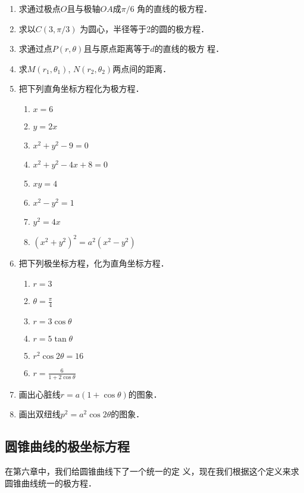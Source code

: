 \begin{ex}
\begin{enumerate}
    \item 求通过极点$O$且与极轴$OA$成$\pi/6$
    角的直线的极方程．
    \item 求以$C(3,\pi/3)$
    为圆心，半径等于2的圆的极方程．
    \item 求通过点$P(r,\theta )$且与原点距离等于$d$的直线的极方
    程．
    \item 求$M(r_1,\theta_1)$, $N(r_2,\theta_2)$两点间的距离．
    \item 把下列直角坐标方程化为极方程．
\begin{multicols}{2}
\begin{enumerate}
\item $x=6$
\item $y=2x$
\item $x^2+y^2-9=0$
\item $x^2+y^2-4x+8=0$
\item $xy=4$
\item $x^2-y^2=1$
\item $y^2=4x$
\item $(x^2+y^2)^2=a^2(x^2-y^2)$
\end{enumerate}
\end{multicols}

    \item 把下列极坐标方程，化为直角坐标方程．
\begin{multicols}{2}
\begin{enumerate}
\item $r=3$
\item $\theta=\frac{\pi}{4}$
\item $r=3\cos\theta$
\item $r=5\tan\theta$
\item $r^2\cos 2\theta=16$
\item $r=\frac{6}{1+2\cos\theta}$
\end{enumerate}
\end{multicols}
    \item 画出心脏线$r=a(1+\cos\theta )$的图象．
    \item 画出双纽线$p^2=a^2\cos2\theta$的图象．
\end{enumerate}
\end{ex}

\subsection{圆锥曲线的极坐标方程}
在第六章中，我们给圆锥曲线下了一个统一的定
义，现在我们根据这个定义来求圆锥曲线统一的极方程．

